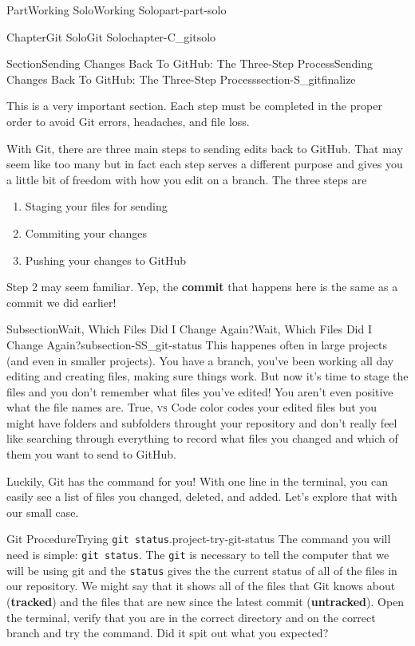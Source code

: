 \documentclass[twoside,10pt,]{book}
\newcommand{\mono}[1]{\texttt{#1}}
\newcommand{\initialism}[1]{\textsc{\MakeLowercase{#1}}}
\newcommand{\terminology}[1]{\textbf{#1}}
\begin{document}
\begin{partptx}{Part}{Working Solo}{}{Working Solo}{}{}{part-part-solo}
\begin{chapterptx}{Chapter}{Git Solo}{}{Git Solo}{}{}{chapter-C_gitsolo}
\begin{sectionptx}{Section}{Sending Changes Back To GitHub: The Three-Step Process}{}{Sending Changes Back To GitHub: The Three-Step Process}{}{}{section-S_gitfinalize}
\begin{introduction}{}
\par
This is a very important section. Each step must be completed in the proper order to avoid Git errors, headaches, and file loss.%
\par
With Git, there are three main steps to sending edits back to GitHub. That may seem like too many but in fact each step serves a different purpose and gives you a little bit of freedom with how you edit on a branch. The three steps are%
\begin{enumerate}
\item{}Staging your files for sending%
\item{}Commiting your changes%
\item{}Pushing your changes to GitHub%
\end{enumerate}
Step 2 may seem familiar. Yep, the \terminology{commit} that happens here is the same as a commit we did earlier!%
\end{introduction}%
%
%
\typeout{************************************************}
\typeout{************************************************}
%
\begin{subsectionptx}{Subsection}{Wait, Which Files Did I Change Again?}{}{Wait, Which Files Did I Change Again?}{}{}{subsection-SS_git-status}
%
This happenes often in large projects (and even in smaller projects). You have a branch, you've been working all day editing and creating files, making sure things work. But now it's time to stage the files and you don't remember what files you've edited! You aren't even positive what the file names are. True, \initialism{VS} Code color codes your edited files but you might have folders and subfolders throught your repository and don't really feel like searching through everything to record what files you changed and which of them you want to send to GitHub.%
\par
Luckily, Git has the command for you! With one line in the terminal, you can easily see a list of files you changed, deleted, and added. Let's explore that with our small case.%
\begin{project}{Git Procedure}{Trying \mono{git status}.}{project-try-git-status}%
%
%
The command you will need is simple: \mono{git status}. The \mono{git} is necessary to tell the computer that we will be using git and the \mono{status} gives the the current status of all of the files in our repository. We might say that it shows all of the files that Git knows about (\terminology{tracked}) and the files that are new since the latest commit (\terminology{untracked}). Open the terminal, verify that you are in the correct directory and on the correct branch and try the command. Did it spit out what you expected?%

\end{project}
\end{subsectionptx}
\end{sectionptx}
\end{chapterptx}
\end{partptx}
\end{document}
